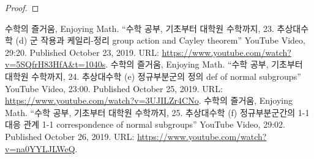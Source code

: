 \documentclass[11pt,openany]{article}
\begin{document}
\begin{proof}
\end{proof}


\vfill
\begin{thebibliography}{9}
	수학의 즐거움, Enjoying Math. ``수학 공부, 기초부터 대학원 수학까지, 23. 추상대수학 (d) 군 작용과 케일리-정리 group action and Cayley theorem'' YouTube Video, 29:20. Published 
	October 23, 2019. URL: \url{https://www.youtube.com/watch?v=5SQfrH83HfA&t=1040s}.
	수학의 즐거움, Enjoying Math. ``수학 공부, 기초부터 대학원 수학까지, 24. 추상대수학 (e) 정규부분군의 정의 def of normal subgroups'' YouTube Video, 23:00. Published 
	October 25, 2019. URL: \url{https://www.youtube.com/watch?v=3UJILZr4CNo}.
	수학의 즐거움, Enjoying Math. ``수학 공부, 기초부터 대학원 수학까지, 25. 추상대수학 (f) 정규부분군간의 1-1 대응 관계 1-1 correspondence of normal subgroups'' YouTube Video, 29:02. Published 
	October 26, 2019. URL: \url{https://www.youtube.com/watch?v=na0YYLJLWeQ}.
\end{thebibliography}

\newpage
\appendix
\end{document}
